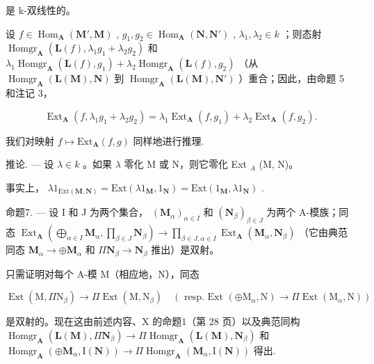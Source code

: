 是 k-双线性的。

设 \(f \in \operatorname{Hom}_{\mathbf{A}}(\mathbf{M}', \mathbf{M})\) , \(g_1, g_2 \in \operatorname{Hom}_{\mathbf{A}}(\mathbf{N}, \mathbf{N}')\) , \(\lambda_1, \lambda_2 \in k\) ；则态射 \(\operatorname{Homgr}_{\mathbf{A}}(\mathbf{L}(f), \lambda_1 g_1 + \lambda_2 g_2)\) 和 \(\lambda_1 \operatorname{Homgr}_{\mathbf{A}}(\mathbf{L}(f), g_1) + \lambda_2 \operatorname{Homgr}_{\mathbf{A}}(\mathbf{L}(f), g_2)\) （从 \(\operatorname{Homgr}_{\mathbf{A}}(\mathbf{L}(\mathbf{M}), \mathbf{N})\) 到 \(\operatorname{Homgr}_{\mathbf{A}}(\mathbf{L}(\mathbf{M}), \mathbf{N}')\) ）重合；因此，由命题 5 和注记 3，

\[
\operatorname{Ext} _ {\mathbf {A}} \left(f, \lambda_ {1} g _ {1} + \lambda_ {2} g _ {2}\right) = \lambda_ {1} \operatorname{Ext} _ {\mathbf {A}} \left(f, g _ {1}\right) + \lambda_ {2} \operatorname{Ext} _ {\mathbf {A}} \left(f, g _ {2}\right).\tag{10}
\]

我们对映射 \(f\mapsto\mathrm{Ext}_{\mathbf{A}}(f,g)\) 同样地进行推理.

推论. --- 设 \(\lambda \in k\) 。如果 \(\lambda\) 零化 M 或 N，则它零化 Ext \(_{A}\) (M, N)。

事实上， \(\lambda 1_{\mathrm{Ext}(\mathbf{M},\mathbf{N})} = \mathrm{Ext}(\lambda 1_{\mathbf{M}},1_{\mathbf{N}}) = \mathrm{Ext}(1_{\mathbf{M}},\lambda 1_{\mathbf{N}})\) .

命题7. --- 设 I 和 J 为两个集合， \((\mathbf{M}_{\alpha})_{\alpha \in I}\) 和 \((\mathbf{N}_{\beta})_{\beta \in J}\) 为两个 A-模族；同态 \(\operatorname{Ext}_{\mathbf{A}}\left(\bigoplus_{\alpha \in I} \mathbf{M}_{\alpha}, \prod_{\beta \in J} \mathbf{N}_{\beta}\right) \to \prod_{\beta \in J, \alpha \in I} \operatorname{Ext}_{\mathbf{A}}(\mathbf{M}_{\alpha}, \mathbf{N}_{\beta})\) （它由典范同态 \(\mathbf{M}_{\alpha} \to \oplus \mathbf{M}_{\alpha}\) 和 \(\Pi \mathbf{N}_{\beta} \to \mathbf{N}_{\beta}\) 推出）是双射。

只需证明对每个 A-模 M（相应地，N），同态

\[
\operatorname{Ext} \left(\mathrm{M}, \Pi \mathrm{N} _ {\beta}\right)\rightarrow \Pi \operatorname{Ext} \left(\mathrm{M}, \mathrm{N} _ {\beta}\right) \quad (\text { resp.   Ext } (\oplus \mathrm{M} _ {\alpha}, \mathrm{N}) \rightarrow \Pi \operatorname{Ext} \left(\mathrm{M} _ {\alpha}, \mathrm{N}\right))
\]

是双射的。现在这由前述内容、X 的命题1（第 28 页）以及典范同构 \(\operatorname{Homgr}_{\mathbf{A}}(\mathbf{L}(\mathbf{M}), \Pi \mathbf{N}_{\beta}) \to \Pi \operatorname{Homgr}_{\mathbf{A}}(\mathbf{L}(\mathbf{M}), \mathbf{N}_{\beta})\) 和 \(\operatorname{Homgr}_{\mathbf{A}}(\oplus \mathbf{M}_{\alpha}, \mathrm{I}(\mathbf{N})) \to \Pi \operatorname{Homgr}_{\mathbf{A}}(\mathbf{M}_{\alpha}, \mathrm{I}(\mathbf{N}))\) 得出.

